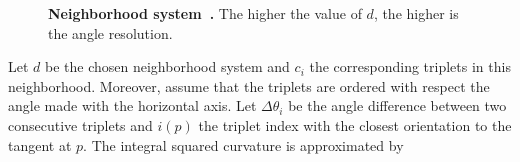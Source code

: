 \begin{figure}
\center
{}\hspace{2em}
\caption{\textbf{Neighborhood system~\cite{nieuwenhuis14efficient}.} The higher the value of $d$, the higher is the angle resolution.}
\label{ch3:fig:nieuweinhuis-neighborhood}
\end{figure}

Let $d$ be the chosen neighborhood system and $c_i$ the corresponding triplets in this neighborhood. Moreover, assume that the triplets are ordered with respect the angle made with the horizontal axis. Let $\Delta \theta_i$ be the angle difference between two consecutive triplets and $i(p)$ the triplet index with the closest orientation to the tangent at $p$. The integral squared curvature is approximated by 


